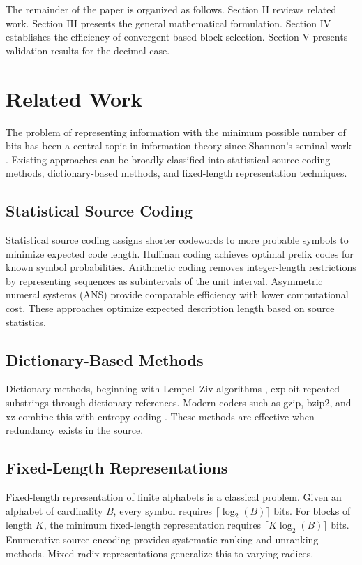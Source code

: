 \documentclass[10pt, conference]{IEEEtran}
\begin{document}
The remainder of the paper is organized as follows. Section II reviews related work. Section III presents the general mathematical formulation. Section IV establishes the efficiency of convergent-based block selection. Section V presents validation results for the decimal case.

\section{Related Work}

The problem of representing information with the minimum possible number of bits has been a central topic in information theory since Shannon's seminal work \cite{shannon}. Existing approaches can be broadly classified into statistical source coding methods, dictionary-based methods, and fixed-length representation techniques.

\subsection{Statistical Source Coding}

Statistical source coding assigns shorter codewords to more probable symbols to minimize expected code length. Huffman coding \cite{huffman} achieves optimal prefix codes for known symbol probabilities. Arithmetic coding \cite{rissanen, witten1987} removes integer-length restrictions by representing sequences as subintervals of the unit interval. Asymmetric numeral systems (ANS) \cite{duda} provide comparable efficiency with lower computational cost. These approaches optimize expected description length based on source statistics.

\subsection{Dictionary-Based Methods}

Dictionary methods, beginning with Lempel--Ziv algorithms \cite{ziv}, exploit repeated substrings through dictionary references. Modern coders such as gzip, bzip2, and xz combine this with entropy coding \cite{sayood, salomon, nelson}. These methods are effective when redundancy exists in the source.

\subsection{Fixed-Length Representations}

Fixed-length representation of finite alphabets is a classical problem. Given an alphabet of cardinality $B$, every symbol requires $\lceil\log_2(B)\rceil$ bits. For blocks of length $K$, the minimum fixed-length representation requires $\lceil K\log_2(B)\rceil$ bits. Enumerative source encoding \cite{cover1973} provides systematic ranking and unranking methods. Mixed-radix representations \cite{knuth2} generalize this to varying radices.
\end{document}
